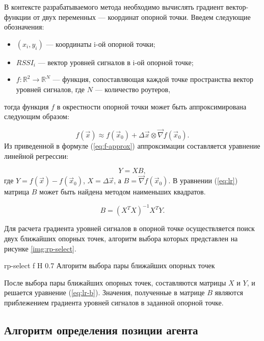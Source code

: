 В контексте разрабатываемого метода необходимо вычислять градиент вектор-функции от двух переменных --- координат опорной точки. Введем следующие обозначения:

\begin{itemize}[label=---]
    \item $(x_i, y_i)$ --- координаты i-ой опорной точки;
    \item $RSSI_i$ --- вектор уровней сигналов в i-ой опорной точке;
    \item $f: \mathbb{R}^2 \rightarrow \mathbb{R}^N$ --- функция, сопоставляющая каждой точке пространства вектор уровней сигналов, где $N$ --- количество роутеров,
\end{itemize}
тогда функция $f$ в окрестности опорной точки может быть аппроксимирована следующим образом:

\begin{equation}
    f(\vec{x}) \approx f(\vec{x}_0) + \Delta \vec{x} \otimes \vec{\nabla} f(\vec{x}_0).
    \label{eq:f-approx}
\end{equation}
Из приведенной в формуле (\ref{eq:f-approx}) аппроксимации составляется уравнение линейной регрессии:

\begin{equation}
    Y = XB,
    \label{eq:lr}
\end{equation}
где $Y = f(\vec{x}) - f (\vec{x}_0)$, $X = \Delta \vec{x}$, а $B = \vec{\nabla} f(\vec{x}_0)$. В уравнении (\ref{eq:lr}) матрица $B$ может быть найдена методом наименьших квадратов.

\begin{equation}
    B = (X^TX)^{-1}X^TY.
    \label{eq:lr-b}
\end{equation}

Для расчета градиента уровней сигналов в опорной точке осуществляется поиск двух ближайших опорных точек, алгоритм выбора которых представлен на рисунке \ref{img:rp-select}.

    {rp-select}
    {f}
    {H}
    {0.7\linewidth}
    {Алгоритм выбора пары ближайших опорных точек}

После выбора пары ближайших опорных точек, составляются матрицы $X$ и $Y$, и решается уравнение (\ref{eq:lr-b}). Значения, полученные в матрице $B$ являются приблежением градиента уровней сигналов в заданной опорной точке.

\subsection{Алгоритм определения позиции агента}

